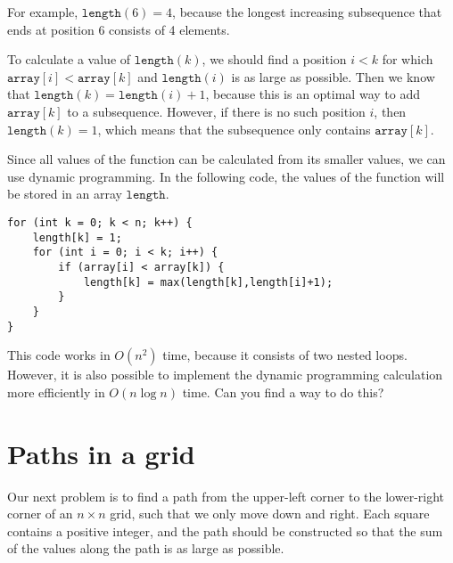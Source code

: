 For example, $\texttt{length}(6)=4$,
because the longest increasing subsequence
that ends at position 6 consists of 4 elements.

To calculate a value of $\texttt{length}(k)$,
we should find a position $i<k$
for which $\texttt{array}[i]<\texttt{array}[k]$
and $\texttt{length}(i)$ is as large as possible.
Then we know that
$\texttt{length}(k)=\texttt{length}(i)+1$,
because this is an optimal way to add
$\texttt{array}[k]$ to a subsequence.
However, if there is no such position $i$,
then $\texttt{length}(k)=1$,
which means that the subsequence only contains
$\texttt{array}[k]$.

Since all values of the function can be calculated
from its smaller values,
we can use dynamic programming.
In the following code, the values
of the function will be stored in an array
$\texttt{length}$.

\begin{lstlisting}
for (int k = 0; k < n; k++) {
    length[k] = 1;
    for (int i = 0; i < k; i++) {
        if (array[i] < array[k]) {
            length[k] = max(length[k],length[i]+1);
        }
    }
}
\end{lstlisting}

This code works in $O(n^2)$ time,
because it consists of two nested loops.
However, it is also possible to implement
the dynamic programming calculation
more efficiently in $O(n \log n)$ time.
Can you find a way to do this?

\section{Paths in a grid}

Our next problem is to find a path
from the upper-left corner to
the lower-right corner
of an $n \times n$ grid, such that
we only move down and right.
Each square contains a positive integer,
and the path should be constructed so
that the sum of the values along
the path is as large as possible.

